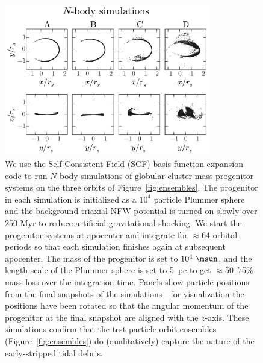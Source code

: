 \begin{figure}[hp!]%
\begin{center}
\includegraphics[width=0.8\textwidth]{figures/ch3/nbody.pdf}
\caption{ We use the Self-Consistent Field (SCF) basis function expansion code
\citep{hernquist92} to run $N$-body simulations of globular-cluster-mass
progenitor systems on the three orbits of Figure~\ref{fig:ensembles}. The
progenitor in each simulation is initialized as a $10^4$ particle Plummer sphere
and the background triaxial NFW potential is turned on slowly over 250 Myr to
reduce artificial gravitational shocking. We start the progenitor systems at
apocenter and integrate for $\approx$64 orbital periods so that each simulation
finishes again at subsequent apocenter. The mass of the progenitor is set to
$10^4~\msun$, and the length-scale of the Plummer sphere is set to 5~pc to get
$\approx$50--75\% mass loss over the integration time. Panels show particle
positions from the final snapshots of the simulations---for visualization the
positions have been rotated so that the angular momentum of the progenitor at
the final snapshot are aligned with the $z$-axis. These simulations confirm that
the test-particle orbit ensembles (Figure~\ref{fig:ensembles}) do
(qualitatively) capture the nature of the early-stripped tidal debris. }
\label{fig:nbodysims}
\end{center}
\end{figure}

